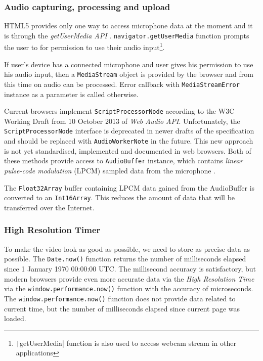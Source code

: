 \subsubsection{Audio capturing, processing and upload}

HTML5 provides only one way to access microphone data at the moment and it is through the \textit{getUserMedia API} \cite{get_user_media}. \verb|navigator.getUserMedia| function prompts the user to for permission to use their audio input\footnote{\texttt|getUserMedia| function is also used to access webcam stream in other applications}.

If user's device has a connected microphone and user gives his permission to use his audio input, then a \verb|MediaStream| object is provided by the browser and from this time on audio can be processed. Error callback with \verb|MediaStreamError| instance as a parameter is called otherwise.

Current browsers implement \verb|ScriptProcessorNode| according to the W3C Working Draft from 10 October 2013 of \textit{Web Audio API}. Unfortunately, the \verb|ScriptProcessorNode| interface is deprecated in newer drafts of the specification and should be replaced with \verb|AudioWorkerNote| in the future\cite{mic_deprecated}. This new approach is not yet standardised, implemented and documented in web browsers. Both of these methods provide access to \verb|AudioBuffer| instance, which contains \textit{linear pulse-code modulation} (LPCM)\cite{wiki_pcm} sampled data from the microphone \cite{mic_pcm}.

The \verb|Float32Array| buffer containing LPCM data gained from the AudioBuffer is converted to an \verb|Int16Array|. This reduces the amount of data that will be transferred over the Internet.



\subsubsection{High Resolution Timer}
To make the video look as good as possible, we need to store as precise data as possible. The \verb|Date.now()| function returns the number of milliseconds elapsed since 1 January 1970 00:00:00 UTC. The millisecond accuracy is satisfactory, but modern browsers provide even more accurate data via the \textit{High Resolution Time} via the \verb|window.performance.now()| function with the accuracy of microseconds. The \verb|window.performance.now()| function does not provide data related to current time, but the number of milliseconds elapsed since current page was loaded.

